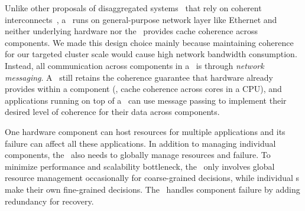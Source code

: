 Unlike other proposals of disaggregated systems~\cite{HP-TheMachine} that rely on coherent interconnects~\cite{GenZ,ccix,OpenCAPI},
a \splitkernel\ runs on general-purpose network layer like Ethernet and 
neither underlying hardware nor the \splitkernel\ provides cache coherence across components.
We made this design choice mainly because maintaining coherence for our targeted cluster scale 
would cause high network bandwidth consumption.
Instead, all communication across components in a \splitkernel\ is through {\em network messaging}.
A \splitkernel\ still retains the coherence guarantee that hardware already provides within a component (\eg, cache coherence across cores in a CPU),
and applications running on top of a \splitkernel\ can use message passing to implement their desired level of coherence for their data across components.

One hardware component can host resources for multiple applications and its failure can affect all these applications.
In addition to managing individual components, the \splitkernel\ also needs to 
globally manage resources and failure.
To minimize performance and scalability bottleneck,
the \splitkernel\ only involves global resource management occasionally for coarse-grained decisions, 
while individual \microos{}s make their own fine-grained decisions.
The \splitkernel\ handles component failure by adding redundancy for recovery.
